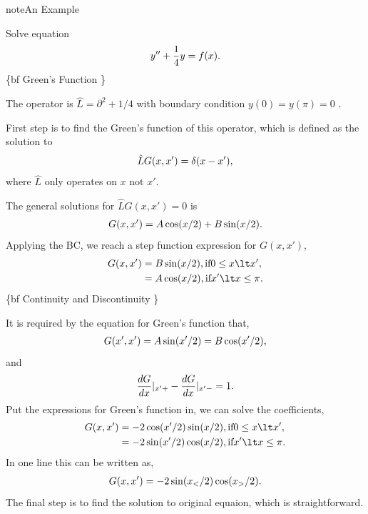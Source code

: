 \documentclass[letterpaper,10pt,english]{sphinxmanual}
\begin{document}
\begin{notice}{note}{An Example}

Solve equation
\begin{gather}
\begin{split}y'' + \frac{1}{4}y = f(x).\end{split}\notag
\end{gather}
\{bf Green's Function \}

The operator is \(\hat L = \partial^2 + 1/4\) with boundary condition \(y(0)=y(\pi)=0\) .

First step is to find the Green's function of this operator, which is defined as the solution to
\begin{gather}
\begin{split}\hat L G(x,x') = \delta(x-x'),\end{split}\notag
\end{gather}
where \(\hat L\) only operates on \(x\) not \(x'\).

The general solutions for \(\hat L G(x,x')=0\) is
\begin{gather}
\begin{split}G(x,x') = A\cos(x/2) + B \sin(x/2).\end{split}\notag
\end{gather}
Applying the BC, we reach a step function expression for \(G(x,x')\),
\begin{gather}
\begin{split}G(x,x') &=    B\sin(x/2) , \text{if} 0\leq x \lt x' , \\
&=A\cos(x/2) , \text{if} x'\lt x \leq \pi .\end{split}\notag
\end{gather}
\{bf Continuity and Discontinuity \}

It is required by the equation for Green's function that,
\begin{gather}
\begin{split}G(x',x') = A \sin(x'/2) = B \cos(x'/2),\end{split}\notag
\end{gather}
and
\begin{gather}
\begin{split}\frac{d G}{d x}\vert_{x'+} - \frac{dG}{dx}\vert_{x'-} = 1 .\end{split}\notag
\end{gather}
Put the expressions for Green's function in, we can solve the coefficients,
\begin{gather}
\begin{split}G(x,x') &=  -2 \cos(x'/2)\sin(x/2) , \text{if} 0\leq x \lt x' ,\\
&= -2 \sin(x'/2)\cos(x/2) , \text{if} x' \lt x \leq \pi .\end{split}\notag
\end{gather}
In one line this can be written as,
\begin{gather}
\begin{split}G(x,x') = -2 \sin(x_</2)\cos(x_>/2) .\end{split}\notag
\end{gather}
The final step is to find the solution to original equaion, which is straightforward.
\end{notice}
\end{document}
